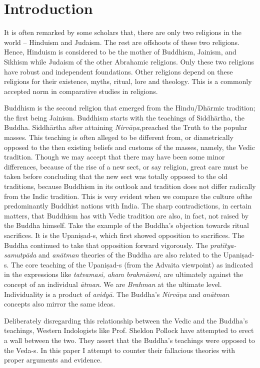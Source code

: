 \section*{Introduction}

It is often remarked by some scholars that, there are only two religions in the world – Hinduism and Judaism. The rest are offshoots of these two religions. Hence, Hinduism is considered to be the mother of Buddhism, Jainism, and Sikhism while Judaism of the other Abrahamic religions. Only these two religions have robust and independent foundations. Other religions depend on these religions for their existence, myths, ritual, lore and theology. This is a commonly accepted norm in comparative studies in religions.

Buddhism is the second religion that emerged from the Hindu/Dhārmic tradition; the first being Jainism. Buddhism starts with the teachings of Siddhārtha, the Buddha. Siddhārtha after attaining \textit{Nirvāṇa},\break preached the Truth to the popular masses. This teaching is often alleged to be different from, or diametrically opposed to the then existing beliefs and customs of the masses, namely, the Vedic tradition. Though we may accept that there may have been some minor differences, because of the rise of a new sect, or say religion, great care must be taken before concluding that the new sect was totally opposed to the old traditions, because Buddhism in its outlook and tradition does not differ radically from the Indic tradition. This is very evident when we compare the culture ofthe predominantly Buddhist nations with India. The sharp contradictions, in certain matters, that Buddhism has with Vedic tradition are also, in fact, not raised by the Buddha himself. Take the example of the Buddha’s objection towards ritual sacrifices. It is the Upaniṣad-s, which first showed opposition to sacrifices. The Buddha continued to take that opposition forward vigorously. The \textit{pratītya-samutpāda} and \textit{anātman} theories of the Buddha are also related to the Upaniṣad-s. The core teaching of the Upaniṣad-s (from the Advaita viewpoint) as indicated in the expressions like \textit{tatvamasi, aham brahmāsmi}, are ultimately against the concept of an individual \textit{ātman}. We are \textit{Brahman} at the ultimate level. Individuality is a product of \textit{avidyā}. The Buddha’s \textit{Nirvāṇa} and \textit{anātman} concepts also mirror the same ideas.

Deliberately disregarding this relationship between the Vedic and the Buddha’s teachings, Western Indologists like Prof. Sheldon Pollock have attempted to erect a wall between the two. They assert that the Buddha’s teachings were opposed to the Veda-s. In this paper I attempt to counter their fallacious theories with proper arguments and evidence.

